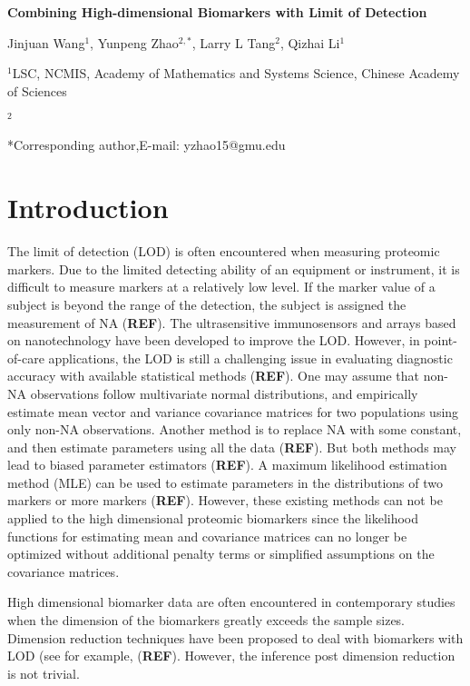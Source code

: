 \documentclass[a4,11pt,epsf, amssymb]{article}
\begin{document}
\begin{center}
{\bf\LARGE Combining High-dimensional Biomarkers with Limit of Detection}

Jinjuan Wang$^1$, Yunpeng Zhao$^{2,*}$, Larry L Tang$^2$, Qizhai Li$^1$

$^1$LSC, NCMIS, Academy of Mathematics and Systems Science, Chinese Academy of Sciences

$^2$

*Corresponding author,E-mail: yzhao15@gmu.edu
\end{center}

\section{Introduction}

The limit of detection (LOD)  is often encountered when measuring proteomic markers. Due to the limited detecting ability of an equipment or instrument, it is difficult to measure markers at a relatively  low level.    If the marker value of a subject is beyond the range of the detection, the subject is assigned the measurement of NA ({\bf REF}).  The ultrasensitive immunosensors and  arrays based on nanotechnology have been developed to improve the LOD. However, in point-of-care applications, the LOD is still a
challenging issue in evaluating diagnostic accuracy    with available statistical methods ({\bf REF}).  One may assume that  non-NA observations   follow multivariate normal distributions, and empirically estimate mean vector and variance covariance matrices for two populations using only non-NA observations.   Another method is to replace NA with some constant, and  then estimate parameters using all the data ({\bf REF}). But both methods may lead to biased parameter estimators ({\bf REF}).
  A maximum likelihood estimation method (MLE) can be used to estimate parameters in the distributions of two markers or more markers   ({\bf REF}). However, these existing methods can not be applied to the high dimensional proteomic biomarkers since the likelihood functions for estimating mean and covariance matrices can no longer be optimized without additional penalty terms or simplified assumptions on the covariance matrices.

High dimensional biomarker data are often encountered in contemporary studies when the dimension of the biomarkers greatly exceeds the sample sizes.  Dimension reduction techniques have been proposed to deal with biomarkers with LOD (see for example, ({\bf REF}). However, the inference post dimension reduction is not trivial.
\end{document}
